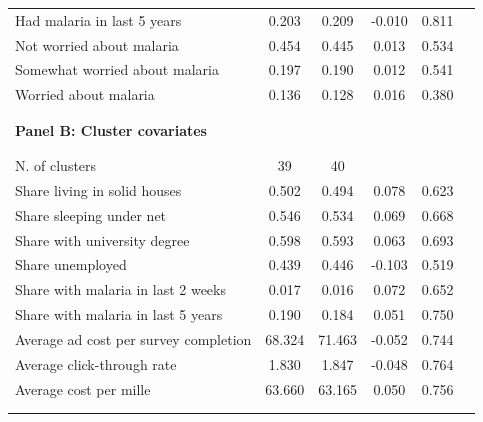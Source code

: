 {\begin{tabular}{lccccc}
Had malaria in last 5 years & 0.203 & 0.209 & -0.010 & 0.811 & \\
Not worried about malaria & 0.454 & 0.445 & 0.013 & 0.534 & \\
Somewhat worried about malaria & 0.197 & 0.190 & 0.012 & 0.541 & \\
Worried about malaria & 0.136 & 0.128 & 0.016 & 0.380 & \\
\hline \hline \\[-5.5ex] &  &  &  &  & \\
\textbf{Panel B: Cluster covariates} &  &  &  &  & \\
 &  &  &  &  & \\[-5ex]\\
N. of clusters & 39 & 40 &  &  & \\
Share living in solid houses & 0.502 & 0.494 & 0.078 & 0.623 & \\
Share sleeping under net & 0.546 & 0.534 & 0.069 & 0.668 & \\
Share with university degree & 0.598 & 0.593 & 0.063 & 0.693 & \\
Share unemployed & 0.439 & 0.446 & -0.103 & 0.519 & \\
Share with malaria in last 2 weeks & 0.017 & 0.016 & 0.072 & 0.652 & \\
Share with malaria in last 5 years & 0.190 & 0.184 & 0.051 & 0.750 & \\
Average ad cost per survey completion & 68.324 & 71.463 & -0.052 & 0.744 & \\
Average click-through rate & 1.830 & 1.847 & -0.048 & 0.764 & \\
Average cost per mille & 63.660 & 63.165 & 0.050 & 0.756 & \\
\hline \\[-5.1ex] &  &  &  &  & \\
\hline\end{tabular}
}%
\\
\hfil\\
